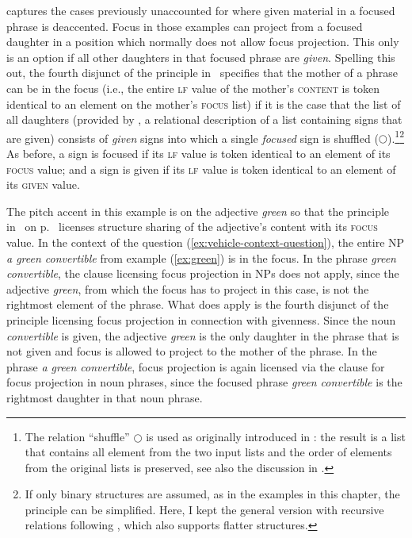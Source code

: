 \documentclass[output=paper
 	        ,biblatex
                ,babelshorthands
                ,newtxmath
                ,draftmode
                ,colorlinks, citecolor=brown
]{langscibook}
\begin{document}
captures the cases previously unaccounted for where given material in a
focused phrase is deaccented. Focus in those examples can project from a
focused daughter in a position which normally does not allow focus
projection.  This only is an option if all other daughters in that
focused phrase are \emph{given}.  Spelling this out, the fourth
disjunct of the principle in~
specifies that the mother of a phrase can be in the focus (i.e., the
entire \textsc{lf} value of the mother's \textsc{content} is token
identical to an element on the mother's \textsc{focus} list) if it is
the case that the list of all daughters (provided by , a relational description of a list containing signs that are given)
consists of \textit{given} signs into which a single \textit{focused}
sign is shuffled ($\bigcirc$).\footnote{The relation ``shuffle'' $\bigcirc$ is used as originally introduced in  \cite{Reape94}: the result is a list that contains all element from the two input lists and the order of elements from the original lists is preserved, see also the discussion in .}\footnote{If only binary structures are
  assumed, as in the examples in this chapter, the principle can be
  simplified. Here, I kept the general version with recursive
  relations following \citet{dKM2003a}, which also
  supports flatter structures.} As before, a sign is focused if its
\textsc{lf} value is token identical to an element of its
\textsc{focus} value; and a sign is given if its \textsc{lf} value is
token identical to an element of its \textsc{given} value.

The pitch accent in this example is on the adjective \textit{green} so
that the principle in~ on p.~\pageref{fig:words} licenses structure
sharing of the adjective's content with its \textsc{focus} value. In
the context of the question (\ref{ex:vehicle-context-question}), the
entire NP \textit{a green convertible} from example (\ref{ex:green}) is
in the focus. In the phrase \textit{green convertible}, the clause
licensing focus projection in NPs does not apply, since the adjective
\textit{green}, from which the focus has to project in this case, is
not the rightmost element of the phrase.  What does apply is the
fourth disjunct of the principle licensing focus projection in
connection with givenness. Since the noun \textit{convertible} is
given, the adjective \textit{green} is the only daughter in the phrase
that is not given and focus is allowed to project to the mother of the
phrase. In the phrase \textit{a green convertible}, focus projection is
again licensed via the clause for focus projection in noun phrases,
since the focused phrase \textit{green convertible} is the rightmost
daughter in that noun phrase.
\end{document}
